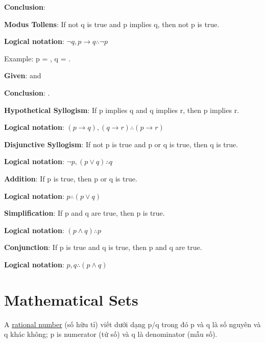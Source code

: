\textbf{Conclusion}: 

\vspace{4 mm}

\textbf{Modus Tollens}: If not q is true and p implies q, then not p is true.

\textbf{Logical notation}: \(\neg q, p \rightarrow q \therefore \neg p\)

Example: p = , q = .

\textbf{Given}:  and 

\textbf{Conclusion}: .

\vspace{10 mm}

\textbf{Hypothetical Syllogism}: If p implies q and q implies r, then p implies r.

\textbf{Logical notation}: \((p \rightarrow q), (q \rightarrow r) \therefore (p \rightarrow r)\)

\vspace{4 mm}

\textbf{Disjunctive Syllogism}: If not p is true and p or q is true, then q is true.

\textbf{Logical notation}: \(\neg p, (p \vee q) \therefore q\)

\vspace{10 mm}

\textbf{Addition}: If p is true, then p or q is true.

\textbf{Logical notation}: \(p \therefore (p \vee q)\)

\vspace{10 mm}

\textbf{Simplification}: If p and q are true, then p is true.

\textbf{Logical notation}: \((p \wedge q) \therefore p\)

\vspace{10 mm}

\textbf{Conjunction}: If p is true and q is true, then p and q are true.

\textbf{Logical notation}: \(p,q \therefore (p \wedge q)\)

\section{Mathematical Sets}

A \href{https://en.wikipedia.org/wiki/Rational_number}{rational number} (số hữu tỉ) viết dưới dạng p/q trong đó p và q là số nguyên và q khác không; p is numerator (tử số) và q là denominator (mẫu số).

